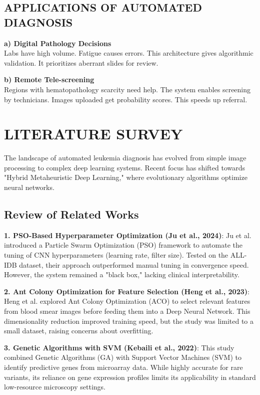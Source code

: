 \documentclass[12pt,a4paper]{article}
\begin{document}
\subsection{APPLICATIONS OF AUTOMATED DIAGNOSIS}
\textbf{a) Digital Pathology Decisions} \\
Labs have high volume. Fatigue causes errors. This architecture gives algorithmic validation. It prioritizes aberrant slides for review.

\textbf{b) Remote Tele-screening} \\
Regions with hematopathology scarcity need help. The system enables screening by technicians. Images uploaded get probability scores. This speeds up referral.

\section{LITERATURE SURVEY}
The landscape of automated leukemia diagnosis has evolved from simple image processing to complex deep learning systems. Recent focus has shifted towards "Hybrid Metaheuristic Deep Learning," where evolutionary algorithms optimize neural networks.

\subsection{Review of Related Works}
\textbf{1. PSO-Based Hyperparameter Optimization (Ju et al., 2024)}: 
Ju et al. \cite{ju2024} introduced a Particle Swarm Optimization (PSO) framework to automate the tuning of CNN hyperparameters (learning rate, filter size). Tested on the ALL-IDB dataset, their approach outperformed manual tuning in convergence speed. However, the system remained a "black box," lacking clinical interpretability.

\textbf{2. Ant Colony Optimization for Feature Selection (Heng et al., 2023)}: 
Heng et al. \cite{heng2023} explored Ant Colony Optimization (ACO) to select relevant features from blood smear images before feeding them into a Deep Neural Network. This dimensionality reduction improved training speed, but the study was limited to a small dataset, raising concerns about overfitting.

\textbf{3. Genetic Algorithms with SVM (Kebaili et al., 2022)}: 
This study \cite{kebaili2022} combined Genetic Algorithms (GA) with Support Vector Machines (SVM) to identify predictive genes from microarray data. While highly accurate for rare variants, its reliance on gene expression profiles limits its applicability in standard low-resource microscopy settings.
\end{document}

